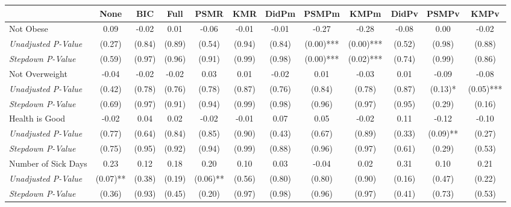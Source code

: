 \begin{tabular}{l c c c c c c c c c c c}
\toprule
 & None & BIC & Full & PSMR & KMR & DidPm & PSMPm & KMPm & DidPv & PSMPv & KMPv \\
\midrule
Not Obese & 0.09 & -0.02 & 0.01 & -0.06 & -0.01 & -0.01 & -0.27 & -0.28 & -0.08 & 0.00 & -0.02 \\
\quad \textit{Unadjusted P-Value} & (0.27) & (0.84) & (0.89) & (0.54) & (0.94) & (0.84) & (0.00)*** & (0.00)*** & (0.52) & (0.98) & (0.88) \\
\quad \textit{Stepdown P-Value} & (0.59) & (0.97) & (0.96) & (0.91) & (0.99) & (0.98) & (0.00)*** & (0.02)*** & (0.74) & (0.99) & (0.86) \\
Not Overweight & -0.04 & -0.02 & -0.02 & 0.03 & 0.01 & -0.02 & 0.01 & -0.03 & 0.01 & -0.09 & -0.08 \\
\quad \textit{Unadjusted P-Value} & (0.42) & (0.78) & (0.76) & (0.78) & (0.87) & (0.76) & (0.84) & (0.78) & (0.87) & (0.13)* & (0.05)*** \\
\quad \textit{Stepdown P-Value} & (0.69) & (0.97) & (0.91) & (0.94) & (0.99) & (0.98) & (0.96) & (0.97) & (0.95) & (0.29) & (0.16) \\
Health is Good & -0.02 & 0.04 & 0.02 & -0.02 & -0.01 & 0.07 & 0.05 & -0.02 & 0.11 & -0.12 & -0.10 \\
\quad \textit{Unadjusted P-Value} & (0.77) & (0.64) & (0.84) & (0.85) & (0.90) & (0.43) & (0.67) & (0.89) & (0.33) & (0.09)** & (0.27) \\
\quad \textit{Stepdown P-Value} & (0.75) & (0.95) & (0.92) & (0.94) & (0.99) & (0.88) & (0.96) & (0.97) & (0.61) & (0.29) & (0.53) \\
Number of Sick Days & 0.23 & 0.12 & 0.18 & 0.20 & 0.10 & 0.03 & -0.04 & 0.02 & 0.31 & 0.10 & 0.21 \\
\quad \textit{Unadjusted P-Value} & (0.07)** & (0.38) & (0.19) & (0.06)** & (0.56) & (0.80) & (0.80) & (0.90) & (0.16) & (0.47) & (0.22) \\
\quad \textit{Stepdown P-Value} & (0.36) & (0.93) & (0.45) & (0.20) & (0.97) & (0.98) & (0.96) & (0.97) & (0.41) & (0.73) & (0.53) \\
\bottomrule
\end{tabular}
